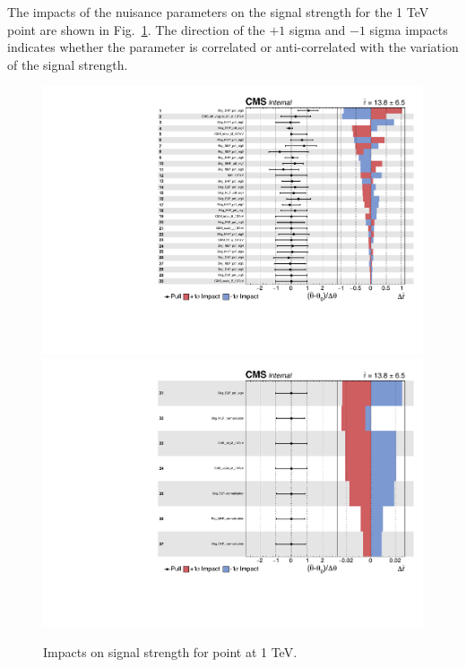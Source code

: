 The impacts of the nuisance parameters on the signal strength for the 1 TeV point are shown in Fig.~\ref{impacts}. The direction of the $+1$ sigma and $-1$ sigma impacts indicates whether the parameter is correlated or anti-correlated with the variation of the signal strength.

\begin{figure}[h]
\centering
\includegraphics[scale=0.65]{figures/limits/impacts_1000_ANP_1.pdf}\\
\includegraphics[scale=0.65]{figures/limits/impacts_1000_ANP_2.pdf}
\caption[Nuisance parameters]{Impacts on signal strength for point at 1 TeV.}
\label{impacts}
\end{figure}
